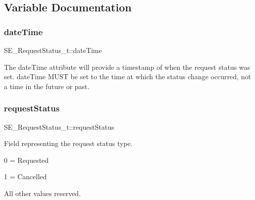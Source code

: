 \subsection{Variable Documentation}
\mbox{\label{group__RequestStatus_ga5a17406904af9612df11590a4fd8b1fe}} 
\subsubsection{\texorpdfstring{date\+Time}{dateTime}}
{\footnotesize\ttfamily S\+E\+\_\+\+Request\+Status\+\_\+t\+::date\+Time}

The date\+Time attribute will provide a timestamp of when the request status was set. date\+Time M\+U\+ST be set to the time at which the status change occurred, not a time in the future or past. \mbox{\label{group__RequestStatus_ga5c594ed3fb20fdf8681c8dfd7957c78d}} 
\subsubsection{\texorpdfstring{request\+Status}{requestStatus}}
{\footnotesize\ttfamily S\+E\+\_\+\+Request\+Status\+\_\+t\+::request\+Status}

Field representing the request status type.

0 = Requested

1 = Cancelled

All other values reserved. 